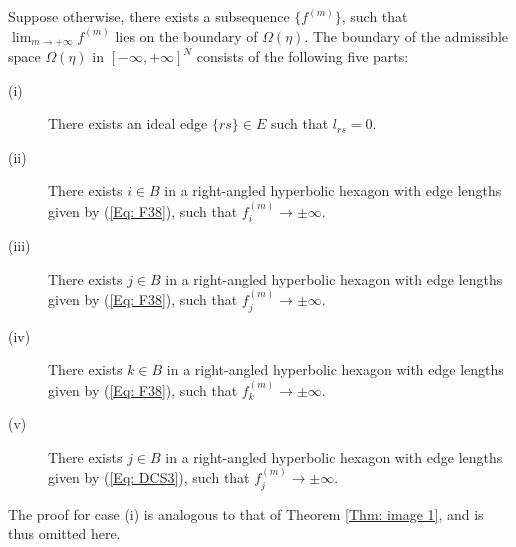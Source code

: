 \documentclass[12pt]{amsart}
\theoremstyle{definition}
\begin{document}
Suppose otherwise, there exists a subsequence $\{f^{(m)}\}$, such that $\lim_{m\rightarrow +\infty}f^{(m)}$ lies on the boundary of $\Omega(\eta)$.
The boundary of the admissible space $\Omega(\eta)$ in $[-\infty,+\infty]^N$ consists of the following five parts:
\begin{description}
\item[(i)]
There exists an ideal edge $\{rs\}\in E$ such that $l_{rs}=0$.
\item[(ii)]
There exists $i\in B$ in a right-angled hyperbolic  hexagon with edge lengths given by (\ref{Eq: F38}), such that $f_i^{(m)}\rightarrow \pm\infty$.
\item[(iii)]
There exists $j\in B$ in a right-angled hyperbolic  hexagon with edge lengths given by (\ref{Eq: F38}), such that $f_j^{(m)}\rightarrow \pm\infty$.
\item[(iv)]
There exists $k\in B$ in a right-angled hyperbolic  hexagon with edge lengths given by (\ref{Eq: F38}), such that $f_k^{(m)}\rightarrow \pm\infty$.
\item[(v)]
There exists $j\in B$ in a right-angled hyperbolic  hexagon with edge lengths given by (\ref{Eq: DCS3}), such that $f_j^{(m)}\rightarrow \pm\infty$.
\end{description}
The proof for case (i) is analogous to that of Theorem \ref{Thm: image 1}, and is thus omitted here.
\end{document}
